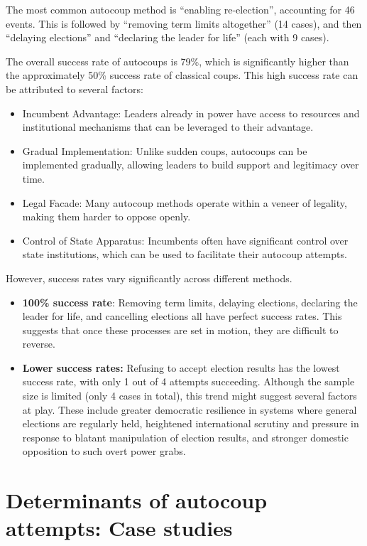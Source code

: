 \documentclass[
  12pt,
]{report}
\begin{document}
The most common autocoup method is ``enabling re-election'', accounting
for 46 events. This is followed by ``removing term limits altogether''
(14 cases), and then ``delaying elections'' and ``declaring the leader
for life'' (each with 9 cases).

The overall success rate of autocoups is 79\%, which is significantly
higher than the approximately 50\% success rate of classical coups. This
high success rate can be attributed to several factors:

\begin{itemize}
\item
  Incumbent Advantage: Leaders already in power have access to resources
  and institutional mechanisms that can be leveraged to their advantage.
\item
  Gradual Implementation: Unlike sudden coups, autocoups can be
  implemented gradually, allowing leaders to build support and
  legitimacy over time.
\item
  Legal Facade: Many autocoup methods operate within a veneer of
  legality, making them harder to oppose openly.
\item
  Control of State Apparatus: Incumbents often have significant control
  over state institutions, which can be used to facilitate their
  autocoup attempts.
\end{itemize}

However, success rates vary significantly across different methods.

\begin{itemize}
\item
  \textbf{100\% success rate}: Removing term limits, delaying elections,
  declaring the leader for life, and cancelling elections all have
  perfect success rates. This suggests that once these processes are set
  in motion, they are difficult to reverse.
\item
  \textbf{Lower success rates:} Refusing to accept election results has
  the lowest success rate, with only 1 out of 4 attempts succeeding.
  Although the sample size is limited (only 4 cases in total), this
  trend might suggest several factors at play. These include greater
  democratic resilience in systems where general elections are regularly
  held, heightened international scrutiny and pressure in response to
  blatant manipulation of election results, and stronger domestic
  opposition to such overt power grabs.
\end{itemize}

\section{Determinants of autocoup attempts: Case
studies}\label{determinants-of-autocoup-attempts-case-studies}
\end{document}
